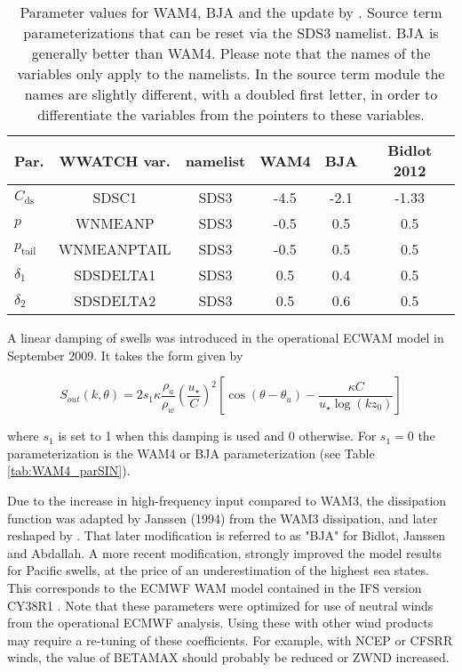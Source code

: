 \begin{table}[htb] 
\begin{center}
\begin{tabular}{|l|c|c|c|c|c|} \hline \hline
Par.                               &  WWATCH var.         & namelist & WAM4 & BJA   & Bidlot 2012 \\
\hline
  $C_{\mathrm{ds}}$                 &  SDSC1          & SDS3 & -4.5 & -2.1& -1.33       \\
  $p$                               &  WNMEANP        & SDS3 & -0.5 & 0.5 &  0.5        \\
  $p_{\mathrm{tail}}$               &  WNMEANPTAIL    & SDS3 & -0.5 & 0.5 &  0.5        \\
  $\delta_1$                        &  SDSDELTA1      & SDS3 & 0.5  & 0.4 &  0.5        \\
  $\delta_2$                        &  SDSDELTA2      & SDS3 & 0.5  & 0.6 &  0.5 \\
  \hline \hline
\end{tabular} \end{center}
\caption{Parameter values for WAM4, BJA and the update by \cite{pro:Bid12}. Source term
parameterizations that can be reset via the {\F SDS3} namelist. BJA is generally
better than WAM4. Please note that the
names of the variables only apply to the namelists. In the source term module
the names are slightly different, with a doubled first letter, in order to
differentiate the variables from the pointers to these variables.} \label{tab:WAM4_parSDS}
\botline
\end{table}


A linear damping of swells was introduced in the operational ECWAM model in September 2009. It takes 
the form given by \cite{bk:Jan04} 

\begin{equation}
S_{out}(k,\theta)= 2 s_1  \kappa \frac{\rho_a }{\rho_w} \left(\frac{u_\star}{C}\right)^2 
\left[\cos \left(\theta - \theta_u\right) - \frac{\kappa C}{u_\star \log(k z_0)}\right]
\end{equation}

\noindent where $s_1$ is set to 1 when this damping is used and 0 otherwise. For $s_1=0$ 
the parameterization is the WAM4 or BJA parameterization (see Table \ref{tab:WAM4_parSIN}). 

Due to the increase in high-frequency input compared to WAM3, the dissipation
function was adapted by Janssen (1994) from the WAM3 dissipation, and later
reshaped by \cite{rep:Bea05}. That later modification is referred to as "BJA" for Bidlot, 
Janssen and Abdallah. A more recent modification, strongly improved the model results for 
Pacific swells, at the price of an underestimation of the highest sea states. This 
corresponds to the ECMWF WAM model contained in the IFS version CY38R1 \citep{pro:Bid12}. Note that these parameters were optimized for use of neutral winds from the 
operational ECMWF analysis. Using these with other wind products may require a re-tuning of these coefficients. For example, with NCEP or CFSRR winds, the value of BETAMAX 
should probably be reduced or ZWND increased. 



